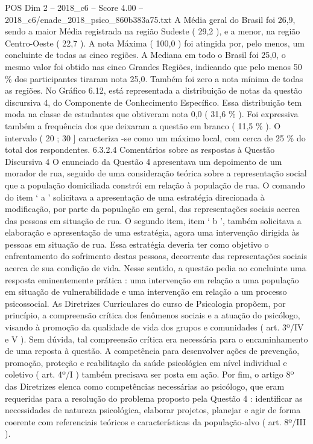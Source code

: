 \begin{textsample}{POS Dim 2 – 2018\_c6 – Score 4.00 – 2018\_c6/enade\_2018\_psico\_860b383a75.txt}
A Média geral do Brasil foi 26,9, sendo a maior Média registrada na região Sudeste ( 29,2 ), e a menor, na região Centro-Oeste ( 22,7 ).
A nota Máxima ( 100,0 ) foi atingida por, pelo menos, um concluinte de todas as cinco regiões.
A Mediana em todo o Brasil foi 25,0, o mesmo valor foi obtido nas cinco Grandes Regiões, indicando que pelo menos 50 \% dos participantes tiraram nota 25,0.
Também foi zero a nota mínima de todas as regiões.
No Gráfico 6.12, está representada a distribuição de notas da questão discursiva 4, do Componente de Conhecimento Específico.
Essa distribuição tem moda na classe de estudantes que obtiveram nota 0,0 ( 31,6 \% ).
Foi expressiva também a frequência dos que deixaram a questão em branco ( 11,5 \% ).
O intervalo ( 20 ; 30 ] caracteriza -se como um máximo local, com cerca de 25 \% do total dos respondentes. 6.3.2.4 Comentários sobre as respostas à Questão Discursiva 4 O enunciado da Questão 4 apresentava um depoimento de um morador de rua, seguido de uma consideração teórica sobre a representação social que a população domiciliada constrói em relação à população de rua.
O comando do item ‘ a ’ solicitava a apresentação de uma estratégia direcionada à modificação, por parte da população em geral, das representações sociais acerca das pessoas em situação de rua.
O segundo item, item ‘ b ’, também solicitava a elaboração e apresentação de uma estratégia, agora uma intervenção dirigida às pessoas em situação de rua.
Essa estratégia deveria ter como objetivo o enfrentamento do sofrimento destas pessoas, decorrente das representações sociais acerca de sua condição de vida.
Nesse sentido, a questão pedia ao concluinte uma resposta eminentemente prática : uma intervenção em relação a uma população em situação de vulnerabilidade e uma intervenção em relação a um processo psicossocial.
As Diretrizes Curriculares do curso de Psicologia propõem, por princípio, a compreensão crítica dos fenômenos sociais e a atuação do psicólogo, visando à promoção da qualidade de vida dos grupos e comunidades ( art. 3º/IV e V ).
Sem dúvida, tal compreensão crítica era necessária para o encaminhamento de uma reposta à questão.
A competência para desenvolver ações de prevenção, promoção, proteção e reabilitação da saúde psicológica em nível individual e coletivo ( art. 4º/I ) também precisava ser posta em ação.
Por fim, o artigo 8º das Diretrizes elenca como competências necessárias ao psicólogo, que eram requeridas para a resolução do problema proposto pela Questão 4 : identificar as necessidades de natureza psicológica, elaborar projetos, planejar e agir de forma coerente com referenciais teóricos e características da população-alvo ( art. 8º/III ).

\end{textsample}
